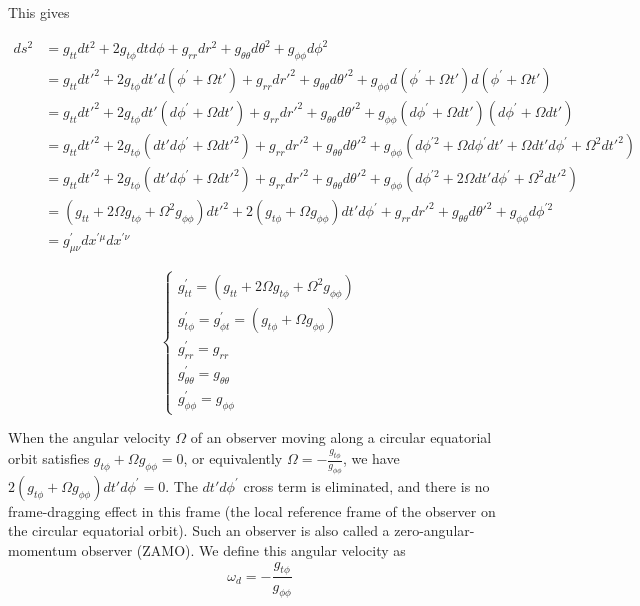 \documentclass[english]{article}
\begin{document}
This gives

\begin{align*}
ds^{2} & =g_{tt}dt^{2}+2g_{t\phi}dtd\phi+g_{rr}dr^{2}+g_{\theta\theta}d\theta^{2}+g_{\phi\phi}d\phi^{2}\\
 & =g_{tt}dt'^{2}+2g_{t\phi}dt'd\left(\phi^{'}+\Omega t'\right)+g_{rr}dr'^{2}+g_{\theta\theta}d\theta'^{2}+g_{\phi\phi}d\left(\phi^{'}+\Omega t'\right)d\left(\phi^{'}+\Omega t'\right)\\
 & =g_{tt}dt'^{2}+2g_{t\phi}dt'\left(d\phi^{'}+\Omega dt'\right)+g_{rr}dr'^{2}+g_{\theta\theta}d\theta'^{2}+g_{\phi\phi}\left(d\phi^{'}+\Omega dt'\right)\left(d\phi^{'}+\Omega dt'\right)\\
 & =g_{tt}dt'^{2}+2g_{t\phi}\left(dt'd\phi^{'}+\Omega dt'^{2}\right)+g_{rr}dr'^{2}+g_{\theta\theta}d\theta'^{2}+g_{\phi\phi}\left(d\phi^{'2}+\Omega d\phi^{'}dt'+\Omega dt'd\phi^{'}+\Omega^{2}dt'^{2}\right)\\
 & =g_{tt}dt'^{2}+2g_{t\phi}\left(dt'd\phi^{'}+\Omega dt'^{2}\right)+g_{rr}dr'^{2}+g_{\theta\theta}d\theta'^{2}+g_{\phi\phi}\left(d\phi^{'2}+2\Omega dt'd\phi^{'}+\Omega^{2}dt'^{2}\right)\\
 & =\left(g_{tt}+2\Omega g_{t\phi}+\Omega^{2}g_{\phi\phi}\right)dt'^{2}+2\left(g_{t\phi}+\Omega g_{\phi\phi}\right)dt'd\phi^{'}+g_{rr}dr'^{2}+g_{\theta\theta}d\theta'^{2}+g_{\phi\phi}d\phi^{'2}\\
 & =g^{'}_{\mu\nu}dx^{'\mu}dx^{'\nu}
\end{align*}

\[
\begin{cases}
g^{'}_{tt}=\left(g_{tt}+2\Omega g_{t\phi}+\Omega^{2}g_{\phi\phi}\right)\\
g^{'}_{t\phi}=g^{'}_{\phi t}=\left(g_{t\phi}+\Omega g_{\phi\phi}\right)\\
g^{'}_{rr}=g_{rr}\\
g^{'}_{\theta\theta}=g_{\theta\theta}\\
g^{'}_{\phi\phi}=g_{\phi\phi}
\end{cases}
\]

When the angular velocity $\Omega$ of an observer moving along a
circular equatorial orbit satisfies $g_{t\phi}+\Omega g_{\phi\phi}=0$,
or equivalently $\Omega=-\frac{g_{t\phi}}{g_{\phi\phi}}$, we have
$2\left(g_{t\phi}+\Omega g_{\phi\phi}\right)dt'd\phi^{'}=0$. The
$dt'd\phi^{'}$ cross term is eliminated, and there is no frame-dragging
effect in this frame (the local reference frame of the observer on
the circular equatorial orbit). Such an observer is also called a
zero-angular-momentum observer (ZAMO). We define this angular velocity
as 
\[
\omega_{d}=-\frac{g_{t\phi}}{g_{\phi\phi}}
\]
\end{document}
